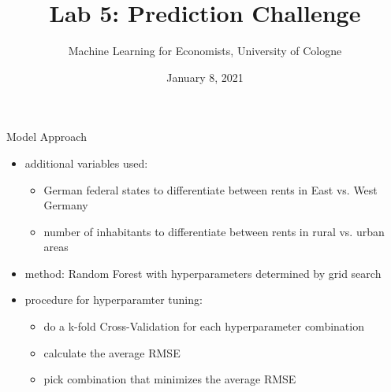 \documentclass[11pt]{beamer}\usepackage[]{graphicx}\usepackage[]{color}
\title{Lab 5: Prediction Challenge}
\subtitle{Machine Learning for Economists, University of Cologne}
\date{January 8, 2021}
\begin{document}
\begin{frame}
\vspace{0.18cm}
\maketitle
\begin{center}
\end{center}
\vspace{0.1cm}
\end{frame}


\begin{frame}{Model Approach}
\begin{itemize}
\item additional variables used: 
\begin{itemize}
\item German federal states to differentiate between rents in East vs. West Germany 
\item number of inhabitants to differentiate between rents in rural vs. urban areas
\end{itemize}
\item method: Random Forest with hyperparameters determined by grid search
\item procedure for hyperparamter tuning:
\begin{itemize}
\item do a k-fold Cross-Validation for each hyperparameter combination
\item calculate the average RMSE
\item pick combination that minimizes the average RMSE
\end{itemize}
\end{itemize}
\end{frame}
\end{document}
